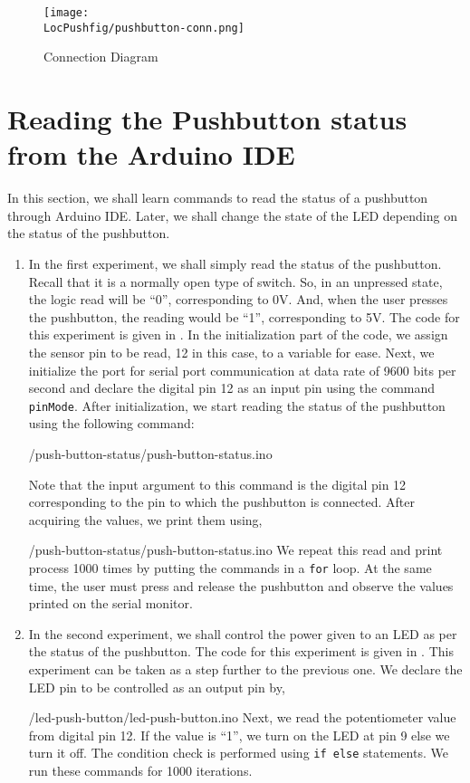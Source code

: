 \begin{figure}
\centering
\texttt{[image: \\LocPushfig/pushbutton-conn.png]}
\caption{Connection Diagram}
\label{fig:pushbuttonconn}
\end{figure}

\section{Reading the Pushbutton status from the Arduino IDE}
In this section, we shall learn commands to read the status of a pushbutton through Arduino IDE. Later, we shall change the state of the LED depending on the status of the pushbutton.
\begin{enumerate}
\item In the first experiment, we shall simply read the status of the
  pushbutton. Recall that it is a normally open type of switch. So, in
  an unpressed state, the logic read will be ``0'', corresponding to
  0V. And, when the user presses the pushbutton, the reading would be
  ``1'', corresponding to 5V. The code for this experiment is given in
  . In the initialization part of the code, we
  assign the sensor pin to be read, 12 in this case, to a variable for
  ease. Next, we initialize the port for serial port communication at
  data rate of 9600 bits per second and declare the digital pin 12 as an input pin using the command {\tt pinMode}. After initialization, we start reading the status of the pushbutton using the following command:
  
  {\LocPushardcode/push-button-status/push-button-status.ino}

  Note that the input argument to this command is the digital pin 12
  corresponding to the pin to which the pushbutton is connected.  After
  acquiring the values, we print them using,
  
  {\LocPushardcode/push-button-status/push-button-status.ino} We
  repeat this read and print process 1000 times by putting the
  commands in a {\tt for} loop. At the same time, the user must press
  and release the pushbutton and observe the values printed on the
serial monitor.

\item In the second experiment, we shall control the power given to an
  LED as per the status of the pushbutton. The code for this
  experiment is given in . This experiment can be
  taken as a step further to the previous one. We declare the LED pin
  to be controlled as an output pin by,
  
  {\LocPushardcode/led-push-button/led-push-button.ino} Next, we read
  the potentiometer value from digital pin 12. If the value is ``1'',
  we turn on the LED at pin 9 else we turn it off. The
  condition check is performed using {\tt if else} statements. We run
  these commands for 1000 iterations.
\end{enumerate}



